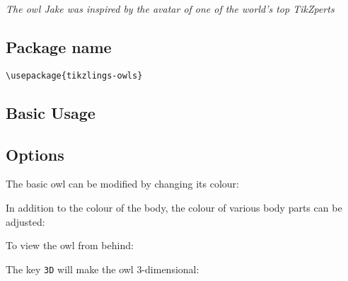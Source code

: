 \documentclass[parskip=half]{scrartcl}
\begin{document}
\emph{The owl Jake was inspired by the avatar of one of the world's top TikZperts}

\subsection{Package name}

\begin{tcolorbox}[lower separated=false, lefthand width=.8\linewidth]
\vspace*{0.5cm}
\lstinline|\usepackage{tikzlings-owls}| 
\vspace*{0.5cm}
\end{tcolorbox}

\subsection{Basic Usage}

\begin{tcblisting}{}
\owl
\end{tcblisting}

\subsection{Options}

The basic owl can be modified by changing its colour:
\begin{tcblisting}{}
\owl[body=blue]
\end{tcblisting}

In addition to the colour of the body, the colour of various body parts can be adjusted:
\begin{tcblisting}{}
\owl[eye=red]
\end{tcblisting}
\begin{tcblisting}{}
\owl[pupil=red]
\end{tcblisting}
\begin{tcblisting}{}
\owl[bill=red]
\end{tcblisting}
\begin{tcblisting}{}
\owl[feet=red]
\end{tcblisting}

To view the owl from behind:
\begin{tcblisting}{}
\owl[back]
\end{tcblisting}

The key \lstinline|3D| will make the owl 3-dimensional:
\begin{tcblisting}{}
\owl[3D]
\end{tcblisting}
\end{document}
